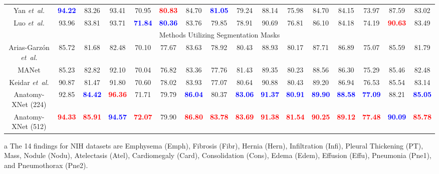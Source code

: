 \documentclass[journal]{IEEEtran}
\newcommand{\etal}{\emph{et~al.}}
\begin{document}
\begin{table*}[!t]
\begin{adjustbox}{width=\textwidth}
\begin{threeparttable}[b]
\begin{tabular}{c|cccccccccccccc|c}
    Yan \etal \cite{Yan2018WeaklySD} & \textcolor{blue}{\bf 94.22} & 83.26 & 93.41 & 70.95 & \textcolor{red}{\bf 80.83} & 84.70 & \textcolor{blue}{\bf 81.05} & 79.24 & 88.14 & 75.98 & 84.70 & 84.15 & 73.97 & 87.59 & 83.02 \\
    Luo \etal \cite{Luo2020DeepME} & 93.96 & 83.81 & 93.71 & \textcolor{blue}{\bf 71.84} & \textcolor{blue}{\bf 80.36} & 83.76 & 79.85 & 78.91 & 90.69 & 76.81 & 86.10 & 84.18 & 74.19 & \textcolor{red}{\bf 90.63} & 83.49 \\
    \hline
    \multicolumn{16}{c}{Methods Utilizing Segmentation Masks} \\
    \hline
    Arias-Garzón \etal \cite{ARIASGARZON2021100138} & 85.72 & 81.68 & 82.48 & 70.10 & 77.67 & 83.63 & 78.92 & 80.43 & 88.93 & 80.17 & 87.71 & 86.89 & 75.07 & 85.59 & 81.79 \\
    MANet \cite{XU202196} & 85.23 & 82.82 & 92.10 & 70.04 & 76.82 & 83.36 & 77.76 & 81.43 & 89.35 & 80.23 & 88.56 & 86.30 & 75.29 & 85.46 & 82.48 \\
    Keidar \etal \cite{Keidar2021} & 90.87 & 81.47 & 91.80 & 70.60 & 78.02 & 83.93 & 77.07 & 80.64 & 90.88 & 80.43 & 89.20 & 86.94 & 76.53 & 85.54 & 83.14 \\
    Anatomy-XNet (224) & 92.85 & \textcolor{blue}{\bf 84.42} & \textcolor{red}{\bf 96.36} & 71.71
    & 79.79 & \textcolor{blue}{\bf 86.04} & 80.37 & \textcolor{blue}{\bf 83.06} & \textcolor{blue}{\bf 91.37} & \textcolor{blue}{\bf 80.91} & \textcolor{blue}{\bf 89.90} & \textcolor{blue}{\bf 88.58} & \textcolor{blue}{\bf 77.09} & 88.21 & \textcolor{blue}{\bf 85.05} \\
    Anatomy-XNet (512) & \textcolor{red}{\bf 94.33} & \textcolor{red}{\bf 85.91} & \textcolor{blue}{\bf 94.57} & \textcolor{red}{\bf 72.07}
    & 79.90 & \textcolor{red}{\bf 86.80} & \textcolor{red}{\bf 83.78} & \textcolor{red}{\bf 83.69} & \textcolor{red}{\bf 91.38} & \textcolor{red}{\bf 81.54} & \textcolor{red}{\bf 90.25} & \textcolor{red}{\bf 89.12} & \textcolor{red}{\bf 77.48} & \textcolor{blue}{\bf 90.09} & \textcolor{red}{\bf 85.78} \\ 
    \bottomrule 
    \end{tabular}
    \begin{tablenotes}
    \item[a] The 14 findings for NIH datasets are Emphysema (Emph), Fibrosis (Fibr), Hernia (Hern), Infiltration (Infi), Pleural Thickening (PT), Mass, Nodule (Nodu), Atelectasis (Atel), Cardiomegaly (Card), Consolidation (Cons), Edema (Edem), Effusion (Effu), Pneumonia (Pne1), and Pneumothorax (Pne2).
    \end{tablenotes}
    \end{threeparttable}
    \end{adjustbox}
\end{table*}
\end{document}

